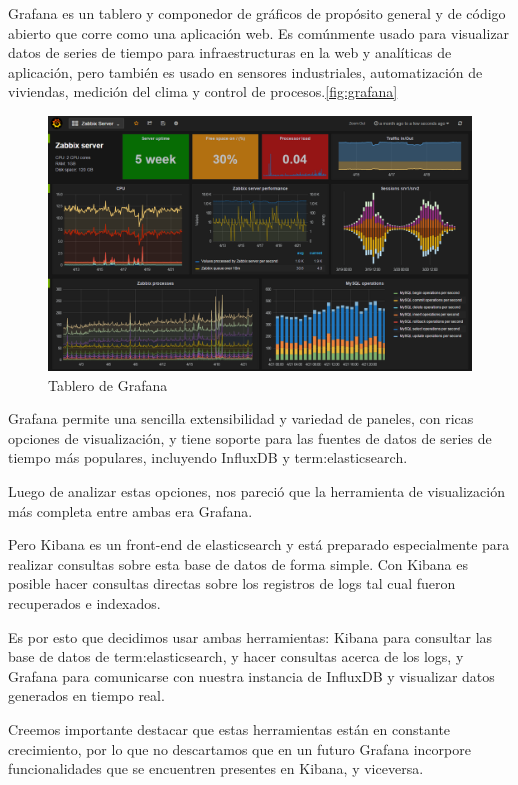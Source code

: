 Grafana es un tablero y componedor de gráficos de propósito general y de código abierto que corre como una aplicación web. Es comúnmente usado para visualizar datos de series de tiempo para infraestructuras en la web y analíticas de aplicación, pero también es usado en sensores industriales, automatización de viviendas, medición del clima y control de procesos.\autoref{fig:grafana}

\begin{figure}
  \includegraphics[width=\linewidth]{src/images/05-capitulo-5/grafana.png}
  \caption{Tablero de Grafana}
  \label{fig:grafana}
\end{figure}

Grafana permite una sencilla extensibilidad y variedad de paneles, con ricas opciones de visualización, y tiene soporte para las fuentes de datos de series de tiempo más populares, incluyendo InfluxDB y \gls{term:elasticsearch}.

Luego de analizar estas opciones, nos pareció que la herramienta de visualización más completa entre ambas era Grafana.

Pero Kibana es un front-end de elasticsearch y está preparado especialmente para realizar consultas sobre esta base de datos de forma simple. Con Kibana es posible hacer consultas directas sobre los registros de logs tal cual fueron recuperados e indexados.

Es por esto que decidimos usar ambas herramientas: Kibana para consultar las base de datos de \gls{term:elasticsearch}, y hacer consultas acerca de los logs, y Grafana para comunicarse con nuestra instancia de InfluxDB y visualizar datos generados en tiempo real.

Creemos importante destacar que estas herramientas están en constante crecimiento, por lo que no descartamos que en un futuro Grafana incorpore funcionalidades que se encuentren presentes en Kibana, y viceversa.
